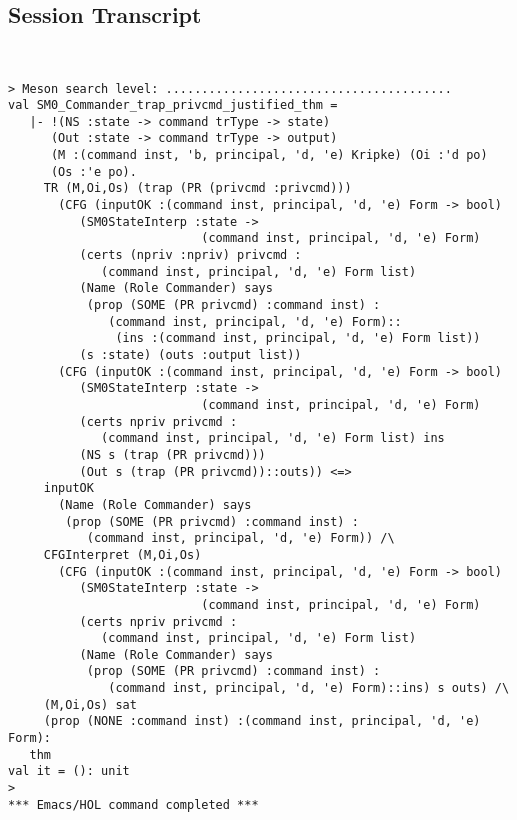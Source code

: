 \documentclass{report}
\begin{document}
\subsection{Session Transcript}
\label{trans2}
\begin{session}
  \begin{scriptsize}
\begin{verbatim}


> Meson search level: ........................................
val SM0_Commander_trap_privcmd_justified_thm =
   |- !(NS :state -> command trType -> state)
      (Out :state -> command trType -> output)
      (M :(command inst, 'b, principal, 'd, 'e) Kripke) (Oi :'d po)
      (Os :'e po).
     TR (M,Oi,Os) (trap (PR (privcmd :privcmd)))
       (CFG (inputOK :(command inst, principal, 'd, 'e) Form -> bool)
          (SM0StateInterp :state ->
                           (command inst, principal, 'd, 'e) Form)
          (certs (npriv :npriv) privcmd :
             (command inst, principal, 'd, 'e) Form list)
          (Name (Role Commander) says
           (prop (SOME (PR privcmd) :command inst) :
              (command inst, principal, 'd, 'e) Form)::
               (ins :(command inst, principal, 'd, 'e) Form list))
          (s :state) (outs :output list))
       (CFG (inputOK :(command inst, principal, 'd, 'e) Form -> bool)
          (SM0StateInterp :state ->
                           (command inst, principal, 'd, 'e) Form)
          (certs npriv privcmd :
             (command inst, principal, 'd, 'e) Form list) ins
          (NS s (trap (PR privcmd)))
          (Out s (trap (PR privcmd))::outs)) <=>
     inputOK
       (Name (Role Commander) says
        (prop (SOME (PR privcmd) :command inst) :
           (command inst, principal, 'd, 'e) Form)) /\
     CFGInterpret (M,Oi,Os)
       (CFG (inputOK :(command inst, principal, 'd, 'e) Form -> bool)
          (SM0StateInterp :state ->
                           (command inst, principal, 'd, 'e) Form)
          (certs npriv privcmd :
             (command inst, principal, 'd, 'e) Form list)
          (Name (Role Commander) says
           (prop (SOME (PR privcmd) :command inst) :
              (command inst, principal, 'd, 'e) Form)::ins) s outs) /\
     (M,Oi,Os) sat
     (prop (NONE :command inst) :(command inst, principal, 'd, 'e) Form):
   thm
val it = (): unit
> 
*** Emacs/HOL command completed ***

\end{verbatim}
  \end{scriptsize}
\end{session}
\end{document}
